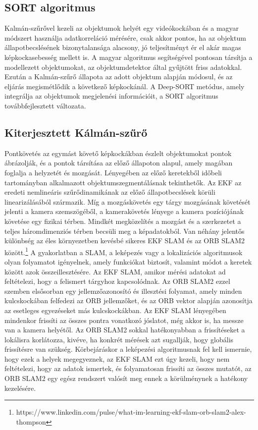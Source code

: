 \subsection{SORT algoritmus}
Kalmán-szűrővel kezeli az objektumok helyét egy videókockában és a magyar módszert használja adatkorreláció mérésére, csak akkor pontos, ha az objektum állapotbecslésének bizonytalansága alacsony, jó teljesítményt ér el akár magas képkockasebesség mellett is. A magyar algoritmus segítségével pontosan társítja a modellezett objektumokat, az objektumdetektor által gyűjtött friss adatokkal. Ezután a Kalmán-szűrő állapota az adott objektum alapján módosul, és az eljárás megismétlődik a következő képkockánál. A Deep-SORT metódus, amely integrálja az objektumok megjelenési információit, a SORT algoritmus továbbfejlesztett változata.

\subsection{Kiterjesztett Kálmán-szűrő\cite{strasdat2012local,zhang2018mobile}}
Pontkövetés az egymást követő képkockákban észlelt objektumokat pontok ábrázolják, és a pontok társítása az előző állapoton alapul, amely magában foglalja a helyzetét és mozgását. Lényegében az előző keretekből időbeli tartományban alkalmazott objektumszegmentálásnak tekinthetők. Az EKF az eredeti nemlineáris szűrődinamikának az előző állapotbecslések körüli linearizálásából származik. Míg a mozgáskövetés egy tárgy mozgásának követését jelenti a kamera szemszögéből, a kamerakövetés lényege a kamera pozíciójának követése egy fizikai térben. Mindkét megközelítés a mozgást és a szerkezetet a teljes háromdimenziós térben becsüli meg a képadatokból. 
Van néhány jelentős különbség az éles környezetben kevésbé sikeres EKF SLAM és az ORB SLAM2 között.\footnote{https://www.linkedin.com/pulse/what-im-learning-ekf-slam-orb-slam2-alex-thompson} A gyakorlatban a SLAM, a leképezés vagy a lokalizációs algoritmusok olyan folyamatot igényelnek, amely funkciókat biztosít, valamint módot a keretek között azok összeillesztésére. Az EKF SLAM, amikor mérési adatokat ad feltételezi, hogy a felismert tárgyhoz kapcsolódnak. Az ORB SLAM2 ezzel szemben elsősorban egy jellemzőazonosító és illesztési folyamat, amely minden kulcskockában felfedezi az ORB jellemzőket, és az ORB vektor alapján azonosítja az esetleges egyezéseket más kulcskockákban. Az EKF SLAM lényegében mindenkor frissíti az összes pontra vonatkozó jóslatot, még akkor is, ha messze van a kamera helyétől. Az ORB SLAM2 sokkal hatékonyabban a frissítéseket a lokálisra korlátozza, kivéve, ha konkrét mérések azt sugallják, hogy globális frissítésre van szükség. Körbejáráskor a leképezési algoritmusnak fel kell ismernie, hogy ezek a helyek megegyeznek, az EKF SLAM ezt úgy kezeli, hogy nem feltételezi, hogy az adatok ismertek, és folyamatosan frissíti az összes mutatót, az ORB SLAM2 egy egész rendszert valósít meg ennek a körülménynek a hatékony kezelésére.

